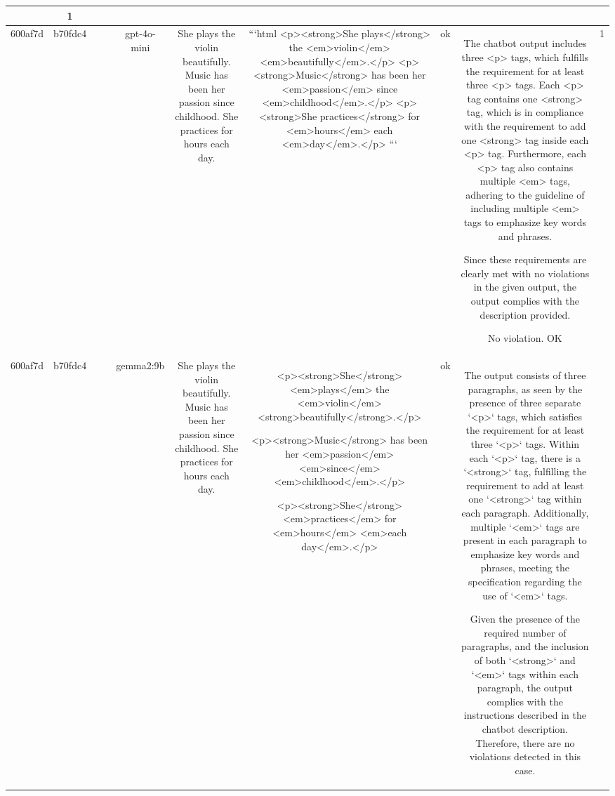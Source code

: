 \begin{table}[h!]
\begin{tabular}{|c|c|c|c|c|c|c|c|c|c|}
{{ERR & 1\\
\hline
600af7d & b70fdc4 &  &  & gpt-4o-mini & She plays the violin beautifully. Music has been her passion since childhood. She practices for hours each day. & ```html
<p><strong>She plays</strong> the <em>violin</em> <em>beautifully</em>.</p>
<p><strong>Music</strong> has been her <em>passion</em> since <em>childhood</em>.</p>
<p><strong>She practices</strong> for <em>hours</em> each <em>day</em>.</p>
``` & ok & The chatbot output includes three <p> tags, which fulfills the requirement for at least three <p> tags. Each <p> tag contains one <strong> tag, which is in compliance with the requirement to add one <strong> tag inside each <p> tag. Furthermore, each <p> tag also contains multiple <em> tags, adhering to the guideline of including multiple <em> tags to emphasize key words and phrases.

Since these requirements are clearly met with no violations in the given output, the output complies with the description provided.

No violation.
OK & 1\\
\hline
600af7d & b70fdc4 &  &  & gemma2:9b & She plays the violin beautifully. Music has been her passion since childhood. She practices for hours each day. & <p><strong>She</strong> <em>plays</em> the <em>violin</em> <strong>beautifully</strong>.</p>

<p><strong>Music</strong> has been her <em>passion</em> <em>since</em> <em>childhood</em>.</p>

<p><strong>She</strong> <em>practices</em> for <em>hours</em> <em>each day</em>.</p>  


 & ok & The output consists of three paragraphs, as seen by the presence of three separate `<p>` tags, which satisfies the requirement for at least three `<p>` tags. Within each `<p>` tag, there is a `<strong>` tag, fulfilling the requirement to add at least one `<strong>` tag within each paragraph. Additionally, multiple `<em>` tags are present in each paragraph to emphasize key words and phrases, meeting the specification regarding the use of `<em>` tags. 

Given the presence of the required number of paragraphs, and the inclusion of both `<strong>` and `<em>` tags within each paragraph, the output complies with the instructions described in the chatbot description. Therefore, there are no violations detected in this case.

}}
\end{tabular}
\end{table}

